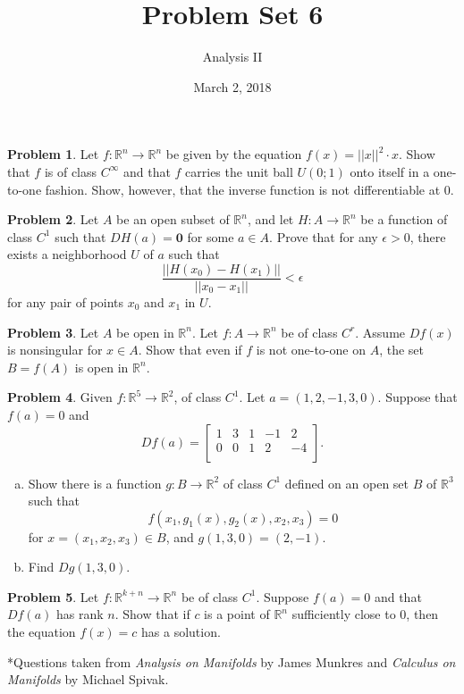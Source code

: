 \documentclass{amsart}
\newcommand{\+}[1]{\ensuremath{\mathbf{#1}}}
\newcommand{\R}{{\mathbb R}}
\theoremstyle{definition}
\newtheorem{prob}{Problem}
\begin{document}
\title{Problem Set 6}
\date{March 2, 2018}
\author{Analysis II}

\maketitle

\begin{prob}
 Let $f: \R^n \to \R^n$ be given by the equation 
 $f(x) = ||x||^2 \cdot x$.
 Show that $f$ is of class $C^\infty$
 and that $f$ carries the unit ball $U(0; 1)$
 onto itself
 in a one-to-one fashion.
 Show, however, that the inverse function
 is not differentiable at $0$.
\end{prob}


\begin{prob}
 Let $A$ be an open subset of $\R^n$, and let $H: A \to \R^n$ be a
 function of class $C^1$ such that $DH(a) = \+0$ for some $a \in A$.
 Prove that for any $\epsilon > 0$, there exists a neighborhood
 $U$ of $a$ such that
 \[
\frac{||H(x_0) - H(x_1)||}{||x_0 - x_1||} < \epsilon 
 \]
 for any pair of points $x_0$ and $x_1$ in $U$.
\end{prob}

\begin{prob}
 Let $A$ be open in $\R^n$.
 Let $f: A \to \R^n$ be
 of class $C^r$.
 Assume $Df(x)$ is nonsingular
 for $x \in A$.
 Show that even if $f$ is not one-to-one
 on $A$, the set $B = f(A)$ 
 is open in $\R^n$.
\end{prob}


\begin{prob}
 Given $f: \R^5 \to \R^2$, of class $C^1$.
 Let $a=(1, 2, -1, 3, 0)$.
 Suppose that
 $f(a) = 0$
 and
 \[
 Df(a) = 
 \begin{bmatrix}
1 & 3 & 1 & -1 & 2 \\ 0 & 0 & 1 & 2 & -4 \\
\end{bmatrix}.
 \]
 \begin{enumerate}[(a)]
  \item Show there is a function $g: B \to \R^2$
  of class $C^1$ defined on an open set $B$ of $\R^3$
  such that
  \[
  f(x_1, g_1(x), g_2(x), x_2, x_3) = 0
  \]
  for $x = (x_1, x_2, x_3) \in B$,
  and $g(1,3,0) = (2,-1)$.
  \item Find $Dg(1,3,0)$.
 \end{enumerate}
\end{prob}


\begin{prob}
 Let $f: \R^{k+n} \to \R^n$ be of class $C^1$.
 Suppose $f(a) = 0$ and that $Df(a)$
 has rank $n$.
 Show that if $c$ is a point of $\R^n$
 sufficiently close to $0$,
 then the equation $f(x) = c$
 has a solution.
\end{prob}

\vspace{10mm}

*Questions taken from \emph{Analysis on Manifolds} by James Munkres and \emph{Calculus on Manifolds} by Michael Spivak.
\end{document}
